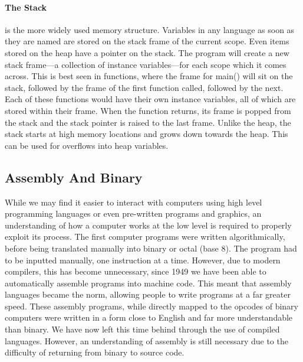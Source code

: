 \documentclass[a4paper,11pt,draft]{article}
\begin{document}
					\paragraph{The Stack}
						is the more widely used memory structure. 
						Variables in any language as soon as they are named are stored on the stack frame of the current scope. 
						Even items stored on the heap have a pointer on the stack. 
						The program will create a new stack frame---a collection of instance variables---for each scope which it comes across. 
						This is best seen in functions, where the frame for main() will sit on the stack, followed by the frame of the first function called, followed by the next. 
						Each of these functions would have their own instance variables, all of which are stored within their frame. 
						When the function returns, its frame is popped from the stack and the stack pointer is raised to the last frame. 
						Unlike the heap, the stack starts at high memory locations and grows down towards the heap. 
						This can be used for overflows into heap variables. 

	\subsection{Assembly And Binary}
		While we may find it easier to interact with computers using high level programming languages or even pre-written programs and graphics, an understanding of how a computer works at the low level is required to properly exploit its process. 
		The first computer programs were written algorithmically, before being translated manually into binary or octal (base 8). 
		The program had to be inputted manually, one instruction at a time. 
		However, due to modern compilers, this has become unnecessary, since 1949 we have been able to automatically assemble programs into machine code. 
		This meant that assembly languages became the norm, allowing people to write programs at a far greater speed.
		These assembly programs, while directly mapped to the opcodes of binary computers were written in a form close to English and far more understandable than binary. 
		We have now left this time behind through the use of compiled languages. 
		However, an understanding of assembly is still necessary due to the difficulty of returning from binary to source code. 
\end{document}
